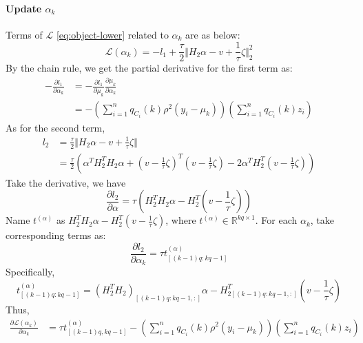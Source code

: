 \documentclass[12pt, a4paper, oneside]{article}
\numberwithin{equation}{section}
\begin{document}
\paragraph{Update $\alpha_k$}  
Terms of $\mathcal{L}$ \ref{eq:object-lower} related to $\alpha_k$ are as below: 
\begin{equation}
\mathcal{L}(\alpha_k) = -l_1 + \frac{\tau}{2}\Vert H_2\alpha - v + \frac{1}{\tau}\zeta\Vert_2^2
\end{equation}
By the chain rule, we get the partial derivative for the first term as:
\begin{equation}
\label{update-alpha-1}
\begin{aligned}
-\frac{\partial l_1}{\partial \alpha_k} &= -\frac{\partial l_1}{\partial \mu_k} \frac{\partial \mu_k}{\partial \alpha_k} \\
&= -\left(\displaystyle\sum_{i=1}^{n}q_{C_i}(k)\rho^2(y_i-\mu_k)\right)\left(\displaystyle\sum_{i=1}^{n}q_{C_i}(k)z_i\right)
\end{aligned}
\end{equation}
As for the second term,
\begin{equation}
\label{update-alpha-2}
\begin{aligned}
l_2 &= \frac{\tau}{2}\Vert H_2\alpha - v + \frac{1}{\tau}\zeta\Vert \\
&= \frac{\tau}{2} \left(\alpha^TH_2^TH_2\alpha+(v-\frac{1}{\tau}\zeta)^T(v-\frac{1}{\tau}\zeta) - 2\alpha^TH_2^T(v-\frac{1}{\tau}\zeta)\right)
\end{aligned}
\end{equation}
Take the derivative, we have
\begin{equation}
\label{update-alpha-3}
\frac{\partial l_2}{\partial \alpha} = \tau \left(H_2^T H_2\alpha - H_2^T(v-\frac{1}{\tau}\zeta)\right) 
\end{equation}
Name $t^{(\alpha)}$ as $H_2^T H_2\alpha - H_2^T(v-\frac{1}{\tau}\zeta)$, where $t^{(\alpha)}\in\mathbb{R}^{kq\times 1}$. For each $\alpha_k$, take corresponding terms as:
\begin{equation}
\label{update-alpha-4}
\frac{\partial l_2}{\partial \alpha_k} = \tau t^{(\alpha)}_{[(k-1)q:kq-1]}
\end{equation}
Specifically,
\begin{equation}
\label{eq:update_alpha-t}
t^{(\alpha)}_{[(k-1)q:kq-1]} = (H_2^T H_2)_{[(k-1)q:kq-1,:]}\alpha - H_{2{[(k-1)q:kq-1,:]}}^T (v-\frac{1}{\tau}\zeta)
\end{equation}
Thus,
\begin{equation}
	\label{update-alpha-5}
	\begin{aligned}
	\frac{\partial \mathcal{L}(\alpha_k)}{\partial \alpha_k} &= \tau t^{(\alpha)}_{[(k-1)q,kq-1]} - \left(\displaystyle\sum_{i=1}^{n}q_{C_i}(k)\rho^2(y_i-\mu_k)\right)\left(\displaystyle\sum_{i=1}^{n}q_{C_i}(k)z_i\right) \\
	\end{aligned}
\end{equation}
\end{document}
